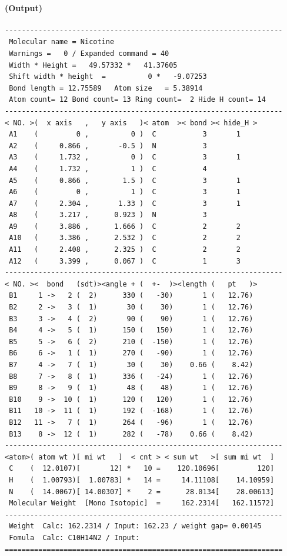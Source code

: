 \documentclass[a4paper]{article}
\begin{document}
\paragraph{(Output)}
\begin{verbatim}
------------------------------------------------------------------
 Molecular name = Nicotine
 Warnings =   0 / Expanded command = 40
 Width * Height =   49.57332 *   41.37605
 Shift width * height  =          0 *   -9.07253
 Bond length = 12.75589   Atom size   = 5.38914
 Atom count= 12 Bond count= 13 Ring count=  2 Hide H count= 14
------------------------------------------------------------------
< NO. >(  x axis   ,   y axis   )< atom  >< bond >< hide_H >
 A1    (         0 ,          0 )  C           3       1
 A2    (     0.866 ,       -0.5 )  N           3
 A3    (     1.732 ,          0 )  C           3       1
 A4    (     1.732 ,          1 )  C           4
 A5    (     0.866 ,        1.5 )  C           3       1
 A6    (         0 ,          1 )  C           3       1
 A7    (     2.304 ,       1.33 )  C           3       1
 A8    (     3.217 ,      0.923 )  N           3
 A9    (     3.886 ,      1.666 )  C           2       2
 A10   (     3.386 ,      2.532 )  C           2       2
 A11   (     2.408 ,      2.325 )  C           2       2
 A12   (     3.399 ,      0.067 )  C           1       3
------------------------------------------------------------------
< NO. ><  bond   (sdt)><angle + (  +-  )><length (   pt   )>
 B1     1 ->   2 (  2)      330 (   -30)       1 (   12.76)
 B2     2 ->   3 (  1)       30 (    30)       1 (   12.76)
 B3     3 ->   4 (  2)       90 (    90)       1 (   12.76)
 B4     4 ->   5 (  1)      150 (   150)       1 (   12.76)
 B5     5 ->   6 (  2)      210 (  -150)       1 (   12.76)
 B6     6 ->   1 (  1)      270 (   -90)       1 (   12.76)
 B7     4 ->   7 (  1)       30 (    30)    0.66 (    8.42)
 B8     7 ->   8 (  1)      336 (   -24)       1 (   12.76)
 B9     8 ->   9 (  1)       48 (    48)       1 (   12.76)
 B10    9 ->  10 (  1)      120 (   120)       1 (   12.76)
 B11   10 ->  11 (  1)      192 (  -168)       1 (   12.76)
 B12   11 ->   7 (  1)      264 (   -96)       1 (   12.76)
 B13    8 ->  12 (  1)      282 (   -78)    0.66 (    8.42)
------------------------------------------------------------------
<atom>( atom wt )[ mi wt   ]  < cnt > < sum wt   >[ sum mi wt  ]
 C    (  12.0107)[       12] *   10 =    120.10696[         120]
 H    (  1.00793)[  1.00783] *   14 =     14.11108[    14.10959]
 N    (  14.0067)[ 14.00307] *    2 =      28.0134[    28.00613]
 Molecular Weight  [Mono Isotopic]  =     162.2314[   162.11572]
------------------------------------------------------------------
 Weight  Calc: 162.2314 / Input: 162.23 / weight gap= 0.00145
 Fomula  Calc: C10H14N2 / Input: 
==================================================================
\end{verbatim}%
\newpage
\noindent%
\end{document}
